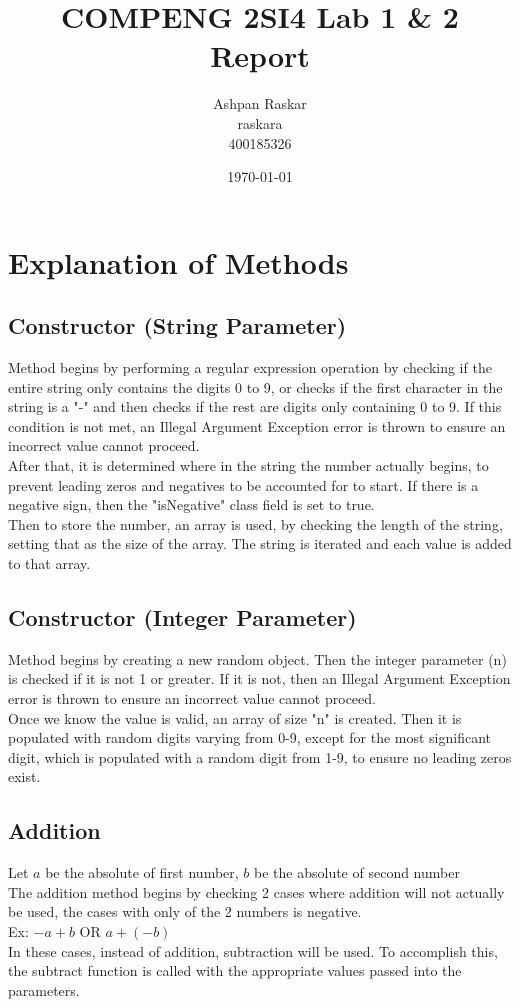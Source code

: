 \documentclass[12pt, letterpaper, titlepage, hidelinks]{article}
\title{COMPENG 2SI4 Lab 1 \& 2 Report}
\author{Ashpan Raskar \\ raskara \\ 400185326}
\date{\today}
\begin{document}
\maketitle
\newpage
\section{Explanation of Methods}
	\subsection{Constructor (String Parameter)}
	\label{section:constructor-string}
		Method begins by performing a regular expression operation by checking if the entire string only contains the digits 0 to 9, or checks if the first character in the string is a "-" and then checks if the rest are digits only containing 0 to 9. If this condition is not met, an Illegal Argument Exception error is thrown to ensure an incorrect value cannot proceed.\\
		After that, it is determined where in the string the number actually begins, to prevent leading zeros and negatives to be accounted for to start. If there is a negative sign, then the "isNegative" class field is set to true.\\
		Then to store the number, an array is used, by checking the length of the string, setting that as the size of the array. The string is iterated and each value is added to that array.
	\subsection{Constructor (Integer Parameter)}
	\label{section:constructor-rng}
		Method begins by creating a new random object. Then the integer parameter (n) is checked if it is not 1 or greater. If it is not, then an Illegal Argument Exception error is thrown to ensure an incorrect value cannot proceed.\\
		Once we know the value is valid, an array of size "n" is created. Then it is populated with random digits varying from 0-9, except for the most significant digit, which is populated with a random digit from 1-9, to ensure no leading zeros exist.
	\subsection{Addition}
	\label{section:add}
		Let $a$ be the absolute of first number, $b$ be the absolute of second number\\
		The addition method begins by checking 2 cases where addition will not actually be used, the cases with only of the 2 numbers is negative.\\ Ex: $-a + b$ OR $a + (-b)$\\
		In these cases, instead of addition, subtraction will be used. To accomplish this, the subtract function is called with the appropriate values passed into the parameters.
\end{document}
